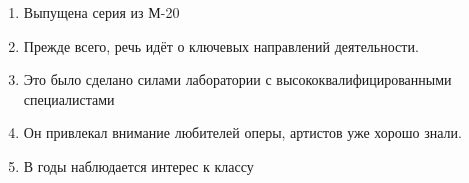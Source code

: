 \documentclass[paper=a4, fontsize=11pt]{scrartcl}
\begin{document}
\begin{enumerate}
    \item Выпущена   серия из    М-20
    \item Прежде всего, речь идёт о \raisebox{-\baselineskip}{\shortstack{\underline{\hspace{3cm}}\\tiivis}}   \raisebox{-\baselineskip}{\shortstack{\underline{\hspace{3cm}}\\kaksi}} ключевых направлений деятельности.
    \item Это было сделано силами \raisebox{-\baselineskip}{\shortstack{\underline{\hspace{3cm}}\\yksi}}  лаборатории с  высококвалифицированными специалистами
    \item Он привлекал внимание \raisebox{-\baselineskip}{\shortstack{\underline{\hspace{3cm}}\\paikallinen}} любителей оперы,  \raisebox{-\baselineskip}{\shortstack{\underline{\hspace{3cm}}\\jotka}}  артистов уже хорошо знали.
    \item В \raisebox{-\baselineskip}{\shortstack{\underline{\hspace{3cm}}\\viime}} годы наблюдается  интерес к  классу

\end{enumerate}
\end{document}
